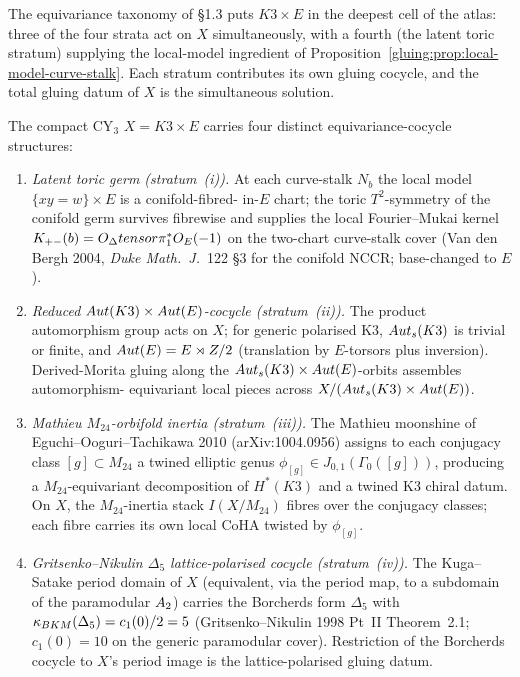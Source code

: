 The equivariance taxonomy of \S 1.3 puts $K3 \times E$ in the deepest
cell of the atlas: three of the four strata act on $X$
simultaneously, with a fourth (the latent toric stratum) supplying
the local-model ingredient of
Proposition~\ref{gluing:prop:local-model-curve-stalk}. Each stratum contributes
its own gluing cocycle, and the total gluing datum of $X$ is the
simultaneous solution.

\begin{theorem}
\label{gluing:thm:k3xe-four-stratum}
The compact CY$_3$ $X = K3 \times E$ carries four distinct
equivariance-cocycle structures:
\begin{enumerate}[label=\textup{(\roman*)}]
 \item \emph{Latent toric germ (stratum~(i)).} At each curve-stalk
 $N_b$ the local model $\{xy = w\} \times E$ is a conifold-fibred-
 in-$E$ chart; the toric $T^2$-symmetry of the conifold germ survives
 fibrewise and supplies the local Fourier--Mukai kernel $K_{+-}(b) =
 O_\Delta tensor \pi_1^*O_{E}(-1)$ on the two-chart curve-stalk
 cover (Van den Bergh 2004, \emph{Duke Math.\ J.}~122 \S 3 for the
 conifold NCCR; base-changed to $E$).
 \item \emph{Reduced $Aut(K3) \times Aut(E)$-cocycle (stratum~(ii)).}
 The product automorphism group acts on $X$; for generic polarised
 K3, $Aut_s(K3)$ is trivial or finite, and $Aut(E) = E \rtimes Z/2$
 (translation by $E$-torsors plus inversion). Derived-Morita gluing
 along the $Aut_s(K3) \times Aut(E)$-orbits assembles automorphism-
 equivariant local pieces across $X / (Aut_s(K3) \times Aut(E))$.
 \item \emph{Mathieu $M_{24}$-orbifold inertia (stratum~(iii)).}
 The Mathieu moonshine of Eguchi--Ooguri--Tachikawa 2010
 (arXiv:1004.0956) assigns to each conjugacy class $[g] \subset
 M_{24}$ a twined elliptic genus $\phi_{[g]} \in J_{0,1}(\Gamma_0([g]))$,
 producing a $M_{24}$-equivariant decomposition of $H^*(K3)$ and
 a twined K3 chiral datum. On $X$, the $M_{24}$-inertia stack
 $I(X/M_{24})$ fibres over the conjugacy classes; each fibre carries
 its own local CoHA twisted by $\phi_{[g]}$.
 \item \emph{Gritsenko--Nikulin $\Delta_5$ lattice-polarised cocycle
 (stratum~(iv)).} The Kuga--Satake period domain of $X$ (equivalent,
 via the period map, to a subdomain of the paramodular
 $A_2$) carries the Borcherds form $\Delta_5$ with
 $\kappa_{BKM}(\Delta_5) = c_1(0)/2 = 5$ (Gritsenko--Nikulin 1998 Pt~II
 Theorem~2.1; $c_1(0) = 10$ on the generic paramodular cover).
 Restriction of the Borcherds cocycle to $X$'s period image is the
 lattice-polarised gluing datum.
\end{enumerate}
\end{theorem}

